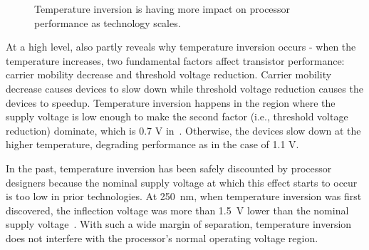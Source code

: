 \begin{figure}[t!]
\captionsetup[subfloat]{width=0.4\textwidth}
\centering 
{}
\hspace{0.4in}
\caption{Temperature inversion is having more impact on processor performance as technology scales.}
\label{fig:motivation-plots}
\vspace{-0.2in}
\end{figure}

At a high level,  also partly reveals why temperature inversion occurs - when the temperature increases, two fundamental factors affect transistor performance: carrier mobility decrease and threshold voltage reduction. Carrier mobility decrease causes devices to slow down while threshold voltage reduction causes the devices to speedup. Temperature inversion happens in the region where the supply voltage is low enough to make the second factor (i.e., threshold voltage reduction) dominate, which is 0.7 V in~. Otherwise, the devices slow down at the higher temperature, degrading performance as in the case of 1.1 V. 

In the past, temperature inversion has been safely discounted by processor designers because the nominal supply voltage at which this effect starts to occur is too low in prior technologies. At 250~nm, when temperature inversion was first discovered, the inflection voltage was more than 1.5~V lower than the nominal supply voltage~\cite{park1995reversal,bellaouar1998supply,dasdan2006handling}. With such a wide margin of separation, temperature inversion does not interfere with the processor's normal operating voltage region.

